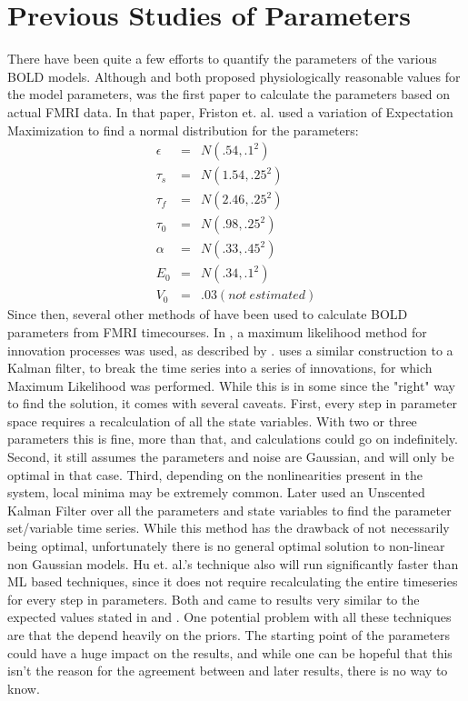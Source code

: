 \section{Previous Studies of Parameters}
There have been quite a few efforts to quantify the parameters of the
various BOLD models.  Although \cite{Buxton1998} and \cite{Friston2000}
both proposed physiologically reasonable values for the model parameters, 
\cite{Friston2002} was the first paper to calculate the parameters based 
on actual FMRI data. In that paper, Friston et. al. used a variation of
Expectation Maximization to find a normal distribution for the parameters:
\begin{eqnarray}
\epsilon &=& N(.54 , .1 ^2 )  \nonumber \\
\tau_s & =&  N(1.54, .25^2)   \nonumber \\
\tau_f & =&  N(2.46, .25^2)   \nonumber \\
\tau_0 & =&  N(.98 , .25^2 )   \nonumber \\
\alpha & =&  N(.33 , .45^2 )   \nonumber \\
E_0   & =&  N(.34 ,  .1 ^2 )   \nonumber \\
V_0  & = &  .03 (not\ estimated) \nonumber
\end{eqnarray}
Since then, several other methods of have been used to calculate
BOLD parameters from FMRI timecourses. In \cite{Riera2004}, a maximum
likelihood method for innovation processes was used, as described by
\cite{Ozaki1994}. \cite{Ozaki1994} uses a similar construction to a 
Kalman filter, to break the time series into a series of innovations,
for which Maximum Likelihood was performed. While this is in some since the
"right" way to find the solution, it comes with several caveats. First, every
step in parameter space requires a recalculation of all the state variables. With
two or three parameters this is fine, more than that, and calculations could go on
indefinitely. Second, it still assumes the parameters and noise are Gaussian, and
will only be optimal in that case. Third, depending on the nonlinearities present
in the system, local minima may be extremely common. Later \cite{Hu2009} used an 
Unscented Kalman Filter over all the parameters and state variables to find the 
parameter set/variable time series. While this method has the drawback of not necessarily
being optimal, unfortunately there is no general optimal solution to non-linear non
Gaussian models. Hu et. al.'s technique also will run significantly faster than
ML based techniques, since it does not require recalculating the entire timeseries
for every step in parameters. Both \cite{Hu2009} and \cite{Friston2002} came to results 
very similar to the expected values stated in \cite{Buxton1998} and \cite{Friston2000}.
One potential problem with all these techniques are that the depend heavily on the
priors. The starting point of the parameters could have a huge impact on the
results, and while one can be hopeful that this isn't the reason for the agreement
between \cite{Friston2000} and later results, there is no way to know. 

